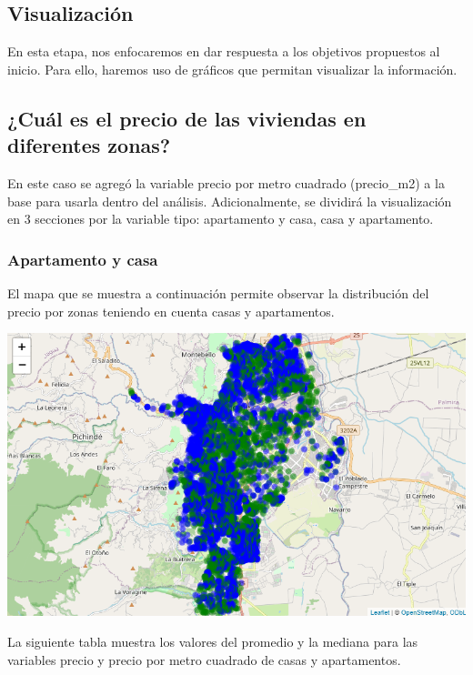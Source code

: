 \documentclass[conference,final,]{IEEEtran}
\begin{document}
\subsection{\textbf{Visualización}}

En esta etapa, nos enfocaremos en dar respuesta a los objetivos
propuestos al inicio. Para ello, haremos uso de gráficos que permitan
visualizar la información.

\subsection{\textbf{¿Cuál es el precio de las viviendas en diferentes zonas?}}

En este caso se agregó la variable precio por metro cuadrado
(precio\_m2) a la base para usarla dentro del análisis. Adicionalmente,
se dividirá la visualización en 3 secciones por la variable tipo:
apartamento y casa, casa y apartamento.\\

\subsubsection{\textbf{Apartamento y casa}}

\hfill\break
El mapa que se muestra a continuación permite observar la distribución
del precio por zonas teniendo en cuenta casas y apartamentos.

\begin{center}\includegraphics[width=0.8\linewidth]{images/Map} \end{center}

La siguiente tabla muestra los valores del promedio y la mediana para
las variables precio y precio por metro cuadrado de casas y
apartamentos.
\end{document}
